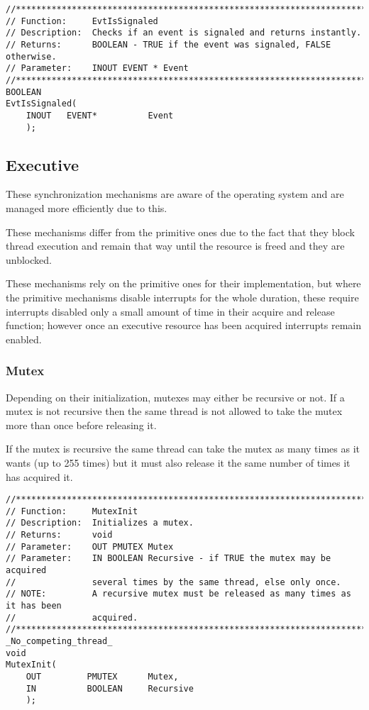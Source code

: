 \begin{appendices}
\begin{lstlisting}[caption={Event Interface},label={lst:Event}]
//******************************************************************************
// Function:     EvtIsSignaled
// Description:  Checks if an event is signaled and returns instantly.
// Returns:      BOOLEAN - TRUE if the event was signaled, FALSE otherwise.
// Parameter:    INOUT EVENT * Event
//******************************************************************************
BOOLEAN
EvtIsSignaled(
    INOUT   EVENT*          Event
    );
\end{lstlisting}

\subsection{Executive}
\label{sect:ExSynch}

These synchronization mechanisms are aware of the operating system and are managed more
efficiently due to this.

These mechanisms differ from the primitive ones due to the fact that they block thread execution and
remain that way until the resource is freed and they are unblocked.

These mechanisms rely on the primitive ones for their implementation, but where the primitive
mechanisms disable interrupts for the whole duration, these require interrupts disabled only a
small amount of time in their acquire and release function; however once an executive resource has
been acquired interrupts remain enabled.

\subsubsection{Mutex}
\label{sect:Mutex}

Depending on their initialization, mutexes may either be recursive or not. If a mutex is not
recursive then the same thread is not allowed to take the mutex more than once before releasing it.

If the mutex is recursive the same thread can take the mutex as many times as it wants (up to 255
times) but it must also release it the same number of times it has acquired it.

\begin{lstlisting}[caption={Mutex Functions},label={lst:MutexFunc}]
//******************************************************************************
// Function:     MutexInit
// Description:  Initializes a mutex.
// Returns:      void
// Parameter:    OUT PMUTEX Mutex
// Parameter:    IN BOOLEAN Recursive - if TRUE the mutex may be acquired
//               several times by the same thread, else only once.
// NOTE:         A recursive mutex must be released as many times as it has been
//               acquired.
//******************************************************************************
_No_competing_thread_
void
MutexInit(
    OUT         PMUTEX      Mutex,
    IN          BOOLEAN     Recursive
    );


\end{lstlisting}
\end{appendices}
